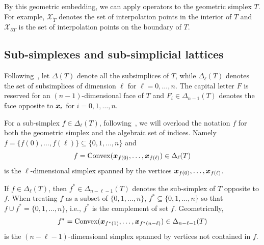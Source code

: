\documentclass[mathpazo]{cicp}
\begin{document}
By this geometric embedding, we can apply operators to the geometric simplex $T$. For example, $\mathcal X_{\mathring{T}}$ denotes the set of interpolation points in the interior of $T$ and $\mathcal X_{\partial T}$ is the set of interpolation points on the boundary of $T$. 


\subsection{Sub-simplexes and sub-simplicial lattices}
Following~\cite{ArnoldFalkWinther2009}, let $\Delta(T)$ denote all the subsimplices of $T$, while $\Delta_{\ell}(T)$ denotes the set of subsimplices of dimension $\ell$ for $\ell=0,\ldots, n$. 
The capital letter $F$ is reserved for an $(n-1)$-dimensional face of $T$ and $F_i\in\Delta_{n-1}(T)$ denotes the face opposite to ${\boldsymbol x}_i$ for $i=0,1,\ldots, n$.

For a sub-simplex $f\in \Delta_{\ell}(T)$, following~\cite{Chen;Huang:2022FEMcomplex3D}, we will overload the notation $f$ for both the geometric simplex and the algebraic set of indices. Namely $f = \{f(0), \ldots, f(\ell)\}\subseteq \{0, 1, \ldots, n\}$ and 
$$
f ={\rm Convex}({\boldsymbol x}_{f(0)}, \ldots, {\boldsymbol x}_{f(\ell)}) \in \Delta_{\ell}(T)
$$
is the $\ell$-dimensional simplex spanned by the vertices ${\boldsymbol x}_{f(0)}, \ldots, {\boldsymbol x}_{f( \ell)}$.

If $f \in \Delta_{\ell}(T)$, then $f^{*} \in \Delta_{n- \ell-1}(T)$ denotes the sub-simplex of $T$ opposite to $f$. When treating $f$ as a subset of $\{0, 1, \ldots, n\}$, $f^*\subseteq \{0,1, \ldots, n\}$ so that $f\cup f^* = \{0, 1, \ldots, n\}$, i.e., $f^*$ is the complement of set $f$. Geometrically,
$$
f^* ={\rm Convex}({\boldsymbol x}_{f^*(1)}, \ldots, {\boldsymbol x}_{f^*(n-\ell)}) \in \Delta_{n- \ell-1}(T)
$$
is the $(n- \ell-1)$-dimensional simplex spanned by vertices not contained in $f$. 
\end{document}
